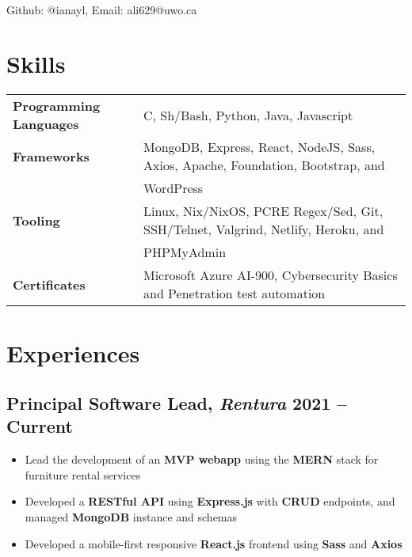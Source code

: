 \documentclass{article}
\author{Ian Li}
\makeatletter
\renewcommand{\maketitle}{
		\vspace{-4em}
		{\huge\bfseries
		\theauthor}
    \vspace{0.2em}
    \\
    Github: @ianayl, Email: ali629@uwo.ca
}
\makeatother
\begin{document}
\maketitle


\section{Skills}

\begin{tabular}{ l l }
    \textbf{Programming Languages} & C, Sh/Bash, Python, Java, Javascript \\
    \textbf{Frameworks} & MongoDB, Express, React, NodeJS, Sass, Axios, Apache, Foundation, Bootstrap, and \\
    & WordPress \\
    \textbf{Tooling} & Linux, Nix/NixOS, PCRE Regex/Sed, Git, SSH/Telnet, Valgrind, Netlify, Heroku, and \\
    & PHPMyAdmin\\
    \textbf{Certificates} & Microsoft Azure AI-900, Cybersecurity Basics and Penetration test automation
\end{tabular}

\section*{Experiences}

\subsection{Principal Software Lead, \textit{Rentura} \hfill \normalsize\textnormal{2021 -- Current}}
\begin{itemize}
    \item Lead the development of an \textbf{MVP webapp} using the \textbf{MERN} stack for furniture rental services
    \item Developed a \textbf{RESTful API} using \textbf{Express.js} with \textbf{CRUD} endpoints, and managed \textbf{MongoDB} instance and schemas 
    \item Developed a mobile-first responsive \textbf{React.js} frontend using \textbf{Sass} and \textbf{Axios}
\end{itemize}
\end{document}
